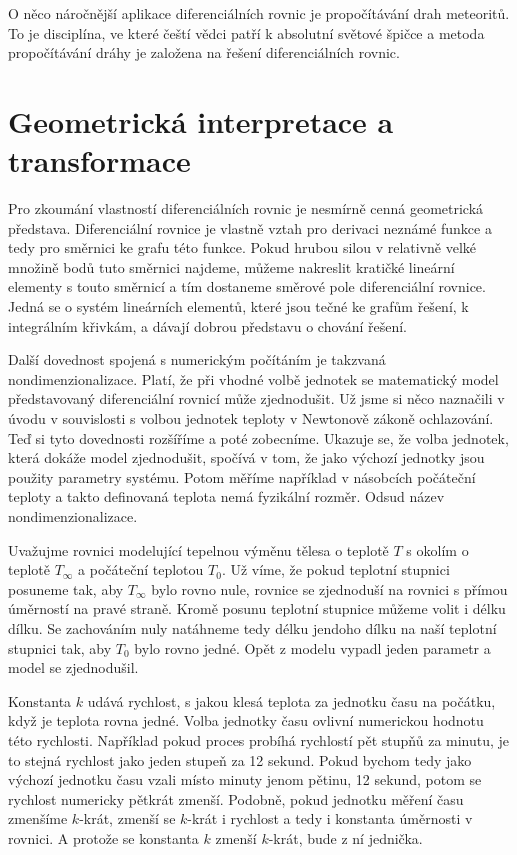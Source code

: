 \documentclass[12pt]{article}
\begin{document}
O něco náročnější aplikace diferenciálních rovnic je propočítávání drah meteoritů. To je disciplína, ve které čeští vědci patří k absolutní světové špičce a metoda propočítávání dráhy je založena na řešení diferenciálních rovnic.


\section*{Geometrická interpretace a transformace}

Pro zkoumání vlastností diferenciálních rovnic je nesmírně cenná geometrická představa. Diferenciální rovnice je vlastně vztah pro derivaci neznámé funkce a tedy pro směrnici ke grafu této funkce. Pokud hrubou silou v relativně velké množině bodů tuto směrnici najdeme, můžeme nakreslit kratičké lineární elementy s touto směrnicí a tím dostaneme směrové pole diferenciální rovnice. Jedná se o systém lineárních elementů, které jsou tečné ke grafům řešení, k integrálním křivkám, a dávají dobrou představu o chování řešení.

Další dovednost spojená s numerickým počítáním je takzvaná nondimenzionalizace. Platí, že při vhodné volbě jednotek se matematický model představovaný diferenciální rovnicí může zjednodušit. Už jsme si něco naznačili v úvodu v souvislosti s volbou jednotek teploty v Newtonově zákoně ochlazování. Teď si tyto dovednosti rozšíříme a poté zobecníme. Ukazuje se, že volba jednotek, která dokáže model zjednodušit, spočívá v tom, že jako výchozí jednotky jsou použity parametry systému. Potom měříme například v násobcích počáteční teploty a takto definovaná teplota nemá fyzikální rozměr. Odsud název nondimenzionalizace.

Uvažujme rovnici modelující tepelnou výměnu tělesa o teplotě $T$ s okolím o teplotě $T_\infty$ a počáteční teplotou $T_0$. Už víme, že pokud teplotní stupnici posuneme tak, aby $T_\infty$ bylo rovno nule, rovnice se zjednoduší na rovnici s přímou úměrností na pravé straně. Kromě posunu teplotní stupnice můžeme volit i délku dílku. Se zachováním nuly natáhneme tedy délku jendoho dílku na naší teplotní stupnici tak, aby $T_0$ bylo rovno jedné. Opět z modelu vypadl jeden parametr a model se zjednodušil.

Konstanta $k$ udává rychlost, s jakou klesá teplota za jednotku času na počátku, když je teplota rovna jedné. Volba jednotky času ovlivní numerickou hodnotu této rychlosti. Například pokud proces probíhá rychlostí pět stupňů za minutu, je to stejná rychlost jako jeden stupeň za 12 sekund. Pokud bychom tedy jako výchozí jednotku času vzali místo minuty jenom pětinu, 12 sekund, potom se rychlost numericky pětkrát zmenší. Podobně, pokud jednotku měření času zmenšíme $k$-krát, zmenší se $k$-krát i rychlost a tedy i konstanta úměrnosti v rovnici. A protože se konstanta $k$ zmenší $k$-krát, bude z ní jednička.
\end{document}
